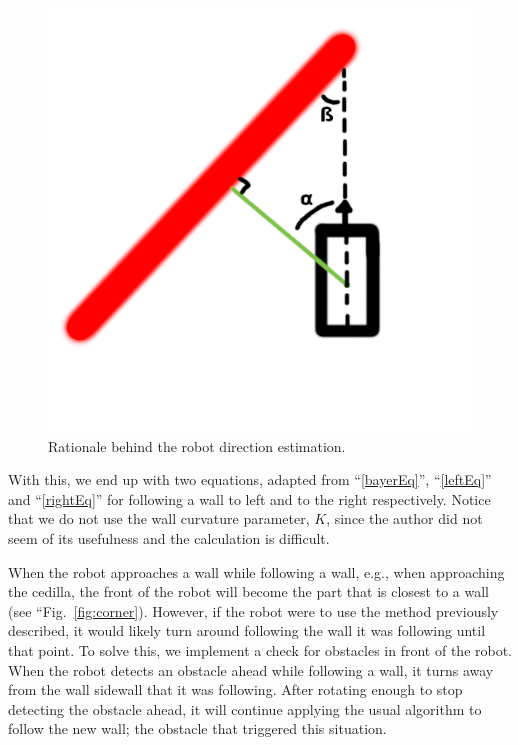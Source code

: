 \documentclass[conference]{IEEEtran}
\begin{document}
\begin{figure}[htbp]
    \centerline{\includegraphics{images/wall_angle.png}}
    \caption{Rationale behind the robot direction estimation.}
    \label{fig:wall_angle}
\end{figure}

With this, we end up with two equations, adapted from ``\eqref{bayerEq}'', ``\eqref{leftEq}'' and ``\eqref{rightEq}'' for following a wall to left and to the right respectively. Notice that we do not use the wall curvature parameter, $K$, since the author did not seem of its usefulness and the calculation is difficult.

When the robot approaches a wall while following a wall, e.g., when approaching the cedilla, the front of the robot will become the part that is closest to a wall (see ``Fig.~\ref{fig:corner}). However, if the robot were to use the method previously described, it would likely turn around following the wall it was following until that point. To solve this, we implement a check for obstacles in front of the robot. When the robot detects an obstacle ahead while following a wall, it turns away from the wall sidewall that it was following. After rotating enough to stop detecting the obstacle ahead, it will continue applying the usual algorithm to follow the new wall; the obstacle that triggered this situation.
\end{document}

